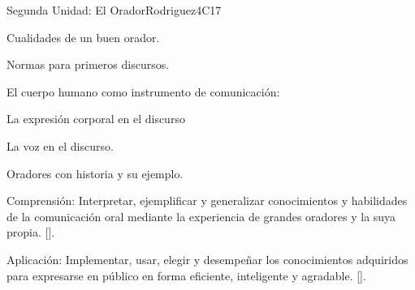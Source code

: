 \begin{syllabus}
\begin{unit}{}{Segunda Unidad: El Orador}{Rodriguez}{4}{C17}
\begin{topics}
	\item Cualidades de un buen orador.
	\item Normas para primeros discursos.
	\item El cuerpo humano como instrumento de comunicación:
		\begin{subtopics}
			\item La expresión  corporal en el discurso
			\item La voz en el discurso.
	   	\end{subtopics}
	\item Oradores con historia y su ejemplo.
\end{topics}
\begin{learningoutcomes}
	\item Comprensión: Interpretar, ejemplificar y generalizar
conocimientos y habilidades de la comunicación oral mediante la experiencia de grandes oradores y la suya propia. [\Usage].
	\item Aplicación: Implementar, usar, elegir y desempeñar los conocimientos adquiridos para  expresarse en público en forma eficiente, inteligente y agradable. [\Usage].
\end{learningoutcomes}
\end{unit}


\end{syllabus}
